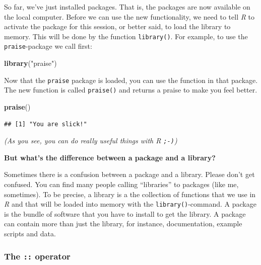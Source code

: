 \documentclass[
]{scrartcl}
\newenvironment{Shaded}{\begin{snugshade}}{\end{snugshade}}
\newcommand{\FunctionTok}[1]{\textcolor[rgb]{0.13,0.29,0.53}{\textbf{#1}}}
\newcommand{\NormalTok}[1]{#1}
\newcommand{\StringTok}[1]{\textcolor[rgb]{0.31,0.60,0.02}{#1}}
\begin{document}
So far, we've just installed packages. That is, the packages are now available on the local computer. Before we can use the new functionality, we need to tell \emph{R} to activate the package for this session, or better said, to load the library to memory. This will be done by the function \texttt{library()}. For example, to use the \texttt{praise}-package we call first:

\begin{Shaded}
\begin{Highlighting}[]
\FunctionTok{library}\NormalTok{(}\StringTok{"praise"}\NormalTok{)}
\end{Highlighting}
\end{Shaded}

Now that the \texttt{praise} package is loaded, you can use the function in that package. The new function is called \texttt{praise()} and returns a praise to make you feel better.

\begin{Shaded}
\begin{Highlighting}[]
\FunctionTok{praise}\NormalTok{()}
\end{Highlighting}
\end{Shaded}

\begin{verbatim}
## [1] "You are slick!"
\end{verbatim}

\emph{(As you see, you can do really useful things with \emph{R} \texttt{;-)})}

\textbf{But what's the difference between a package and a library?}

Sometimes there is a confusion between a package and a library. Please don't get confused. You can find many people calling ``libraries'' to packages (like me, sometimes). To be precise, a library is a the collection of functions that we use in \emph{R} and that will be loaded into memory with the \texttt{library()}-command. A package is the bundle of software that you have to install to get the library. A package can contain more than just the library, for instance, documentation, example scripts and data.

\subsubsection*{\texorpdfstring{The \texttt{::} operator}{The :: operator}}\label{the-operator}
\end{document}
